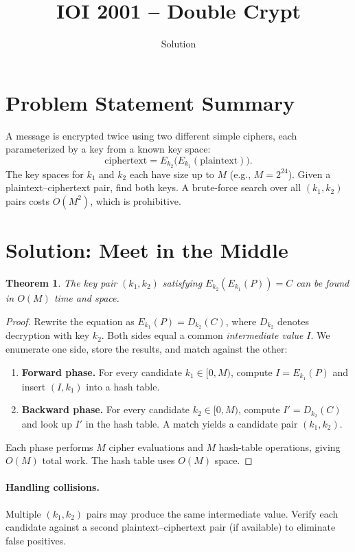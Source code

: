 \documentclass[11pt,a4paper]{article}
\title{IOI 2001 -- Double Crypt}
\author{Solution}
\date{}
\newtheorem{theorem}{Theorem}
\begin{document}
\maketitle

\section{Problem Statement Summary}
A message is encrypted twice using two different simple ciphers, each
parameterized by a key from a known key space:
\[
  \mathrm{ciphertext} = E_{k_2}\bigl(E_{k_1}(\mathrm{plaintext})\bigr).
\]
The key spaces for $k_1$ and $k_2$ each have size up to $M$
(e.g., $M = 2^{24}$). Given a plaintext--ciphertext pair, find
both keys. A brute-force search over all $(k_1, k_2)$ pairs costs
$O(M^2)$, which is prohibitive.

\section{Solution: Meet in the Middle}

\begin{theorem}
The key pair $(k_1, k_2)$ satisfying
$E_{k_2}(E_{k_1}(P)) = C$ can be found in $O(M)$ time and space.
\end{theorem}

\begin{proof}
Rewrite the equation as $E_{k_1}(P) = D_{k_2}(C)$, where $D_{k_2}$
denotes decryption with key $k_2$. Both sides equal a common
\emph{intermediate value} $I$. We enumerate one side, store the
results, and match against the other:

\begin{enumerate}
  \item \textbf{Forward phase.} For every candidate $k_1 \in [0, M)$,
        compute $I = E_{k_1}(P)$ and insert $(I, k_1)$ into a hash table.
  \item \textbf{Backward phase.} For every candidate $k_2 \in [0, M)$,
        compute $I' = D_{k_2}(C)$ and look up $I'$ in the hash table.
        A match yields a candidate pair $(k_1, k_2)$.
\end{enumerate}

Each phase performs $M$ cipher evaluations and $M$ hash-table
operations, giving $O(M)$ total work. The hash table uses $O(M)$ space.
\end{proof}

\paragraph{Handling collisions.}
Multiple $(k_1, k_2)$ pairs may produce the same intermediate value.
Verify each candidate against a second plaintext--ciphertext pair (if
available) to eliminate false positives.
\end{document}
